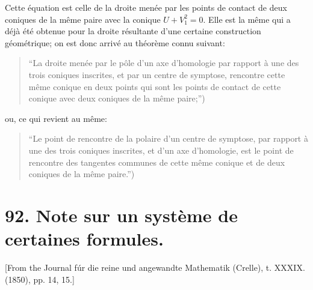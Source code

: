 \documentclass[11pt,a4paper]{book}
\begin{document}
Cette \'{e}quation est celle de la droite men\'{e}e par les points de contact de deux coniques de la m\^{e}me paire avec la conique $U + V_1^2 = 0$. Elle est la m\^{e}me qui a d\'{e}j\`{a} \'{e}t\'{e} obtenue pour la droite r\'{e}sultante d'une certaine construction g\'{e}om\'{e}trique; on est donc arriv\'{e} au th\'{e}or\`{e}me connu suivant:

\begin{quote}
``La droite men\'{e}e par le p\^{o}le d'un axe d'homologie par rapport \`{a} une des trois coniques inscrites, et par un centre de symptose, rencontre cette m\^{e}me conique en deux points qui sont les points de contact de cette conique avec deux coniques de la m\^{e}me paire;'')
\end{quote}
ou, ce qui revient au m\^{e}me:
\begin{quote}
``Le point de rencontre de la polaire d'un centre de symptose, par rapport \`{a} une des trois coniques inscrites, et d'un axe d'homologie, est le point de rencontre des tangentes communes de cette m\^{e}me conique et de deux coniques de la m\^{e}me paire.'')
\end{quote}

\newpage

\section*{92. Note sur un syst\`{e}me de certaines formules.}

[From the Journal f\'{u}r die reine und angewandte Mathematik (Crelle), t. XXXIX. (1850), pp. 14, 15.]
\end{document}
